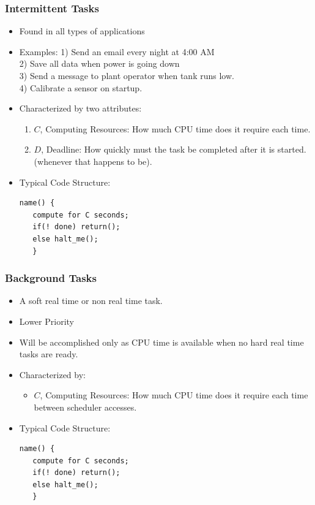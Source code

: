 \subsubsection{Intermittent Tasks}
\begin{itemize}
        \item Found in  all types of applications
        \item Examples: 1) Send an email every night at 4:00 AM\\
        2) Save all data when power is going down \\
        3) Send a message to plant operator when tank runs low.\\
        4) Calibrate a sensor on startup.

        \item Characterized by two attributes:
                \begin{enumerate}
                        \item $C$, Computing Resources: How much CPU time  does it require each time.
                        \item $D$, Deadline: How quickly must the task be completed after it
is started. (whenever that happens to be).
                \end{enumerate}
         \item Typical Code Structure:
\begin{verbatim}
name() {
   compute for C seconds;
   if(! done) return();
   else halt_me();
   }
\end{verbatim}
\end{itemize}


\subsubsection{Background Tasks}
\begin{itemize}
        \item A soft real time or non real time task.
        \item Lower Priority
        \item Will be accomplished only as CPU time is available when no
        hard real time tasks are ready.
        \item Characterized by:
                \begin{itemize}
                         \item $C$, Computing Resources: How much CPU time  does
                         it require each time between scheduler accesses.
                \end{itemize}
         \item Typical Code Structure:
\begin{verbatim}
name() {
   compute for C seconds;
   if(! done) return();
   else halt_me();
   }
\end{verbatim}
\end{itemize}



